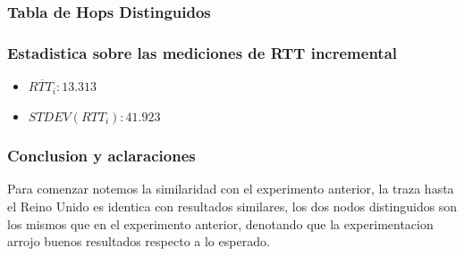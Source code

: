 \subsubsection{Tabla de Hops Distinguidos}
\begin{center}
\end{center}

\subsubsection{Estadistica sobre las mediciones de RTT incremental}
\begin{itemize}
	\item $\overline{RTT_i}: 13.313$
	\item $STDEV(RTT_i): 41.923$
\end{itemize}

\subsubsection{Conclusion y aclaraciones}
Para comenzar notemos la similaridad con el experimento anterior, la traza hasta el Reino Unido es identica con resultados similares, los dos nodos distinguidos son los mismos que en el experimento anterior, denotando que la experimentacion arrojo buenos resultados respecto a lo esperado. 
